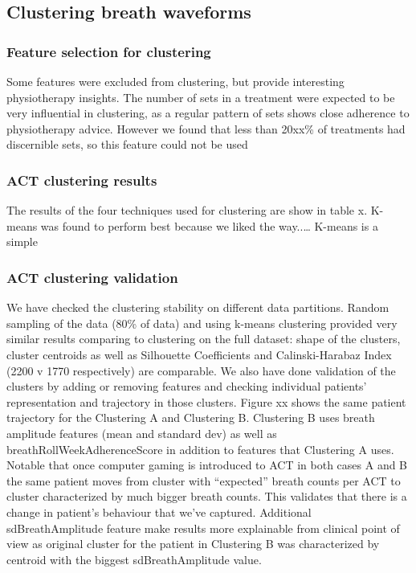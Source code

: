 \documentclass{article}
\begin{document}
\subsection{Clustering breath waveforms}
\subsubsection{Feature selection for clustering}
Some features were excluded from clustering, but provide interesting physiotherapy insights.  
The number of sets in a treatment were expected to be very influential in clustering, as a regular pattern of sets shows close adherence to physiotherapy advice. However we found that less than 20xx\% of treatments had discernible sets, so this feature could not be used


\subsubsection{ACT clustering results}
The results of the four techniques used for clustering are show in table x. K-means was found to perform best because we liked the way..… K-means is a simple 


\subsubsection{ACT clustering validation}

We have checked the clustering stability on different data partitions.  Random sampling of the data (80\% of data) and using k-means clustering provided very similar results comparing to clustering on the full dataset:  shape of the clusters, cluster centroids as well as Silhouette Coefficients and Calinski-Harabaz Index  (2200 v 1770 respectively) are comparable. 
We also have done validation of the clusters by adding or removing features and checking individual patients’ representation and trajectory in those clusters. Figure xx shows the same patient trajectory for the Clustering A and Clustering B. Clustering B uses breath amplitude features (mean and standard dev) as well as breathRollWeekAdherenceScore in addition to features that Clustering A uses. Notable that  once computer gaming is introduced to ACT in both cases A and B the same patient moves from cluster with “expected” breath counts per ACT to cluster characterized by much bigger breath counts. This validates that there is a change in patient’s behaviour that we’ve captured. Additional sdBreathAmplitude feature make results more explainable from clinical point of view as original cluster for the patient in Clustering B was characterized by centroid with the biggest sdBreathAmplitude value. 
\end{document}
